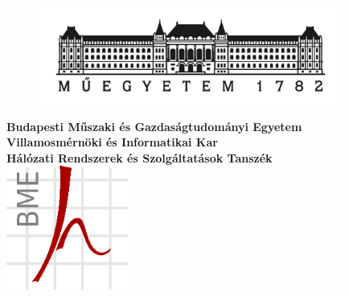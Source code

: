 \begin{titlepage}

\begin{figure}
\centering
\includegraphics[width=100mm,keepaspectratio]{logo/bme.pdf}
\end{figure}

\centering
\textbf{Budapesti Műszaki és Gazdaságtudományi Egyetem}\\
\textbf{Villamosmérnöki és Informatikai Kar}\\
\textbf{Hálózati Rendszerek és Szolgáltatások Tanszék}\\
\vspace{5mm}
\includegraphics[width=40mm,keepaspectratio]{logo/HIT_szurke_karikaba_nagy.png}  \\
\vspace{30mm}
\Huge
\dokumentumcim\\
\vspace{54mm}
\Large
\thetitle \\
\vspace{6mm}
\Large
\textbf{\theauthor}\\
\vspace{6mm}
\the\year


\end{titlepage}